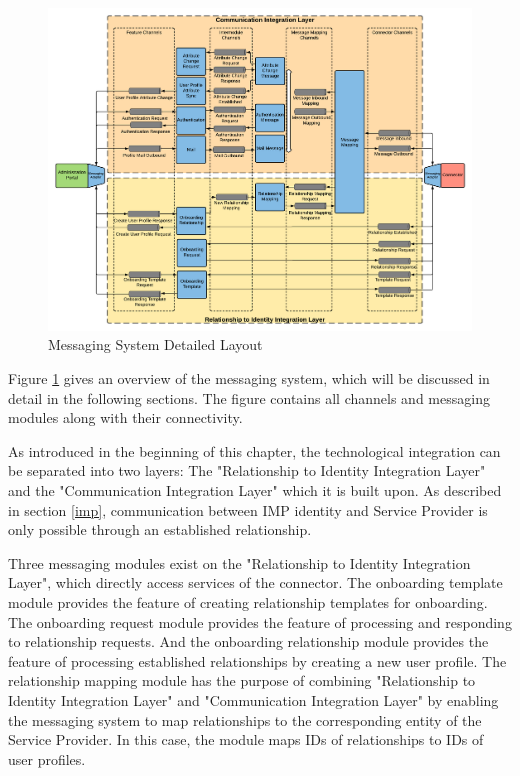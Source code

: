 \begin{figure}[h!]
    \centering
    \includegraphics[scale=0.45]{Diagrams/Integration Architecture 1/Technological Integration/4. Messaging Overview.pdf}
    \caption{Messaging System Detailed Layout}
    \label{integration1:messaging_system_overview}
\end{figure}

Figure \ref{integration1:messaging_system_overview} gives an overview of the messaging system, which will be discussed in detail in the following sections. The figure contains all channels and messaging modules along with their connectivity.

As introduced in the beginning of this chapter, the technological integration can be separated into two layers: The "Relationship to Identity Integration Layer" and the "Communication Integration Layer" which it is built upon. As described in section \ref{imp}, communication between IMP identity and Service Provider is only possible through an established relationship.

Three messaging modules exist on the "Relationship to Identity Integration Layer", which directly access services of the connector. The onboarding template module provides the feature of creating relationship templates for onboarding. The onboarding request module provides the feature of processing and responding to relationship requests. And the onboarding relationship module provides the feature of processing established relationships by creating a new user profile. The relationship mapping module has the purpose of combining "Relationship to Identity Integration Layer" and "Communication Integration Layer" by enabling the messaging system to map relationships to the corresponding entity of the Service Provider. In this case, the module maps IDs of relationships to IDs of user profiles.

